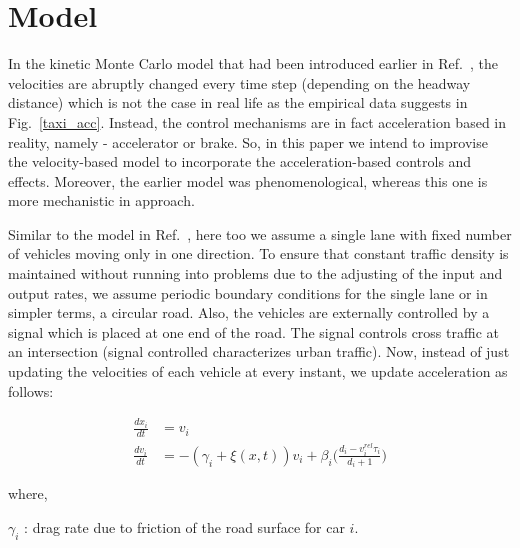 \documentclass[conference]{IEEEtran}
\begin{document}

\section{Model}
In the kinetic Monte Carlo model that had been introduced earlier in Ref.~\cite{Majith2016}, the velocities are abruptly changed every time step (depending on the headway distance) which is not the case in real life as the empirical data suggests in Fig.~\ref{taxi_acc}. Instead, the control mechanisms are in fact acceleration based in reality, namely - accelerator or brake. So, in this paper we intend to improvise the velocity-based model to incorporate the acceleration-based controls and effects. Moreover, the earlier model was phenomenological, whereas this one is more mechanistic in approach. %

Similar to the model in Ref.~\cite{Majith2016}, here too we assume a single lane with fixed number of vehicles moving only in one direction. %
To ensure that constant traffic density is maintained without running into problems due to the  adjusting of the input and output rates, we assume periodic boundary conditions for the single lane or in simpler terms, a circular road. Also, the vehicles are externally controlled by a signal which is placed at one end of the road. %
The signal controls cross traffic at an intersection (signal controlled characterizes urban traffic). Now, instead of just updating the velocities of each vehicle at every instant, we update acceleration as follows:

\begin{equation}
\begin{split}
    \frac{dx_{i}}{dt} &= v_{i}\\
    \frac{dv_{i}}{dt} &= -(\gamma_{i} + \xi(x,t))v_{i} + \beta_{i}\bigg(\frac{d_{i}-v^{rel}_{i}\tau_{i}}{d_{i}+1}\bigg)
\end{split}
\label{dxdv}\end{equation}

where,


$\gamma_{i}$ : drag rate due to friction of the road surface for car $i$.
\end{document}
